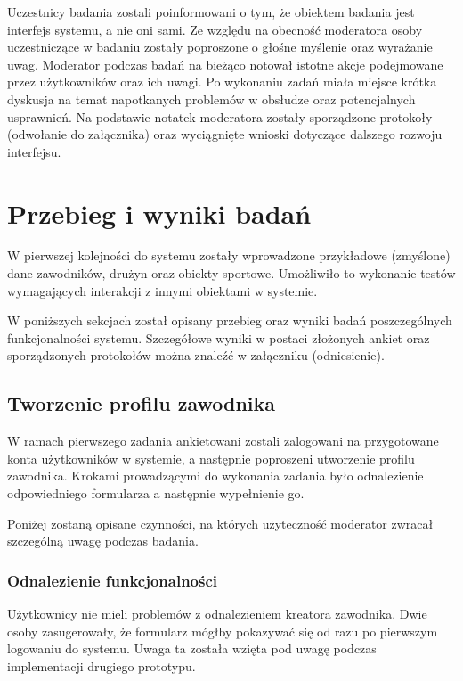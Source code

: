 Uczestnicy badania zostali poinformowani o tym, że obiektem badania jest interfejs systemu, a nie oni sami. Ze względu na obecność moderatora osoby uczestniczące w badaniu zostały poproszone o głośne myślenie oraz wyrażanie uwag. Moderator podczas badań na bieżąco notował istotne akcje podejmowane przez użytkowników oraz ich uwagi. Po wykonaniu zadań miała miejsce krótka dyskusja na temat napotkanych problemów w obsłudze oraz potencjalnych usprawnień. Na podstawie notatek moderatora zostały sporządzone protokoły (odwołanie do załącznika) oraz wyciągnięte wnioski dotyczące dalszego rozwoju interfejsu.

\section{Przebieg i wyniki badań}

W pierwszej kolejności do systemu zostały wprowadzone przykładowe (zmyślone) dane zawodników, drużyn oraz obiekty sportowe. Umożliwiło to wykonanie testów wymagających interakcji z innymi obiektami w systemie.

W poniższych sekcjach został opisany przebieg oraz wyniki badań poszczególnych funkcjonalności systemu. Szczegółowe wyniki w postaci złożonych ankiet oraz sporządzonych protokołów można znaleźć w załączniku (odniesienie).

\subsection{Tworzenie profilu zawodnika}

W ramach pierwszego zadania ankietowani zostali zalogowani na przygotowane konta użytkowników w systemie, a następnie poproszeni utworzenie profilu zawodnika. Krokami prowadzącymi do wykonania zadania było odnalezienie odpowiedniego formularza a następnie wypełnienie go. 

Poniżej zostaną opisane czynności, na których użyteczność moderator zwracał szczególną uwagę podczas badania.

\subsubsection{Odnalezienie funkcjonalności}

Użytkownicy nie mieli problemów z odnalezieniem kreatora zawodnika. Dwie osoby zasugerowały, że formularz mógłby pokazywać się od razu po pierwszym logowaniu do systemu. Uwaga ta została wzięta pod uwagę podczas implementacji drugiego prototypu.

